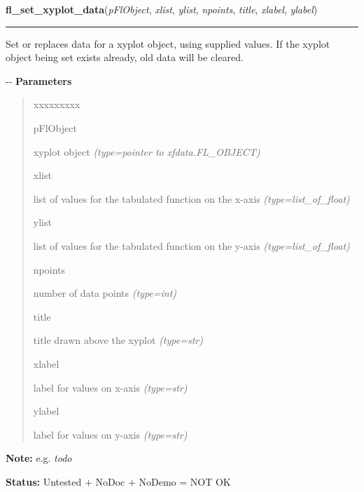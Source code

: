 \hspace{.8\funcindent}\begin{boxedminipage}{\funcwidth}

    \raggedright \textbf{fl\_set\_xyplot\_data}(\textit{pFlObject}, \textit{xlist}, \textit{ylist}, \textit{npoints}, \textit{title}, \textit{xlabel}, \textit{ylabel})

    \vspace{-1.5ex}

    \rule{\textwidth}{0.5\fboxrule}
\setlength{\parskip}{2ex}

Set or replaces data for a xyplot object, using supplied values. If
the xyplot object being set exists already, old data will be cleared.

-{}-
\setlength{\parskip}{1ex}
      \textbf{Parameters}
      \vspace{-1ex}

      \begin{quote}
        \begin{Ventry}{xxxxxxxxx}

          \item[pFlObject]


xyplot object
            {\it (type=pointer to xfdata.FL\_OBJECT)}

          \item[xlist]


list of values for the tabulated function on the x-axis
            {\it (type=list\_of\_float)}

          \item[ylist]


list of values for the tabulated function on the y-axis
            {\it (type=list\_of\_float)}

          \item[npoints]


number of data points
            {\it (type=int)}

          \item[title]


title drawn above the xyplot
            {\it (type=str)}

          \item[xlabel]


label for values on x-axis
            {\it (type=str)}

          \item[ylabel]


label for values on y-axis
            {\it (type=str)}

        \end{Ventry}

      \end{quote}

\textbf{Note:} 
e.g. \emph{todo}


\textbf{Status:} 
Untested + NoDoc + NoDemo = NOT OK


    \end{boxedminipage}

